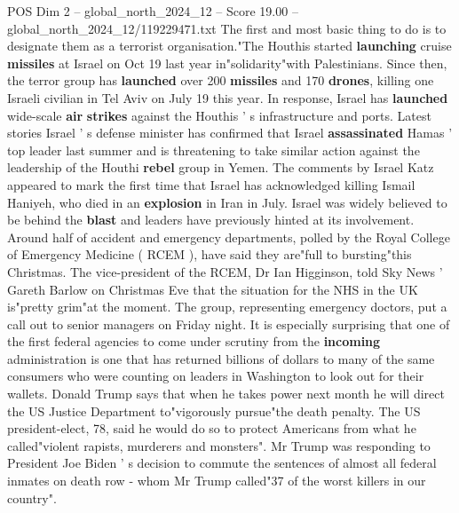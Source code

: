 \begin{textsample}{POS Dim 2 – global\_north\_2024\_12 – Score 19.00 – global\_north\_2024\_12/119229471.txt}
The first and most basic thing to do is to designate them as a terrorist organisation."The Houthis started \textbf{launching} cruise \textbf{missiles} at Israel on Oct 19 last year in"solidarity"with Palestinians.
Since then, the terror group has \textbf{launched} over 200 \textbf{missiles} and 170 \textbf{drones}, killing one Israeli civilian in Tel Aviv on July 19 this year.
In response, Israel has \textbf{launched} wide-scale \textbf{air} \textbf{strikes} against the Houthis ' s infrastructure and ports.
Latest stories Israel ' s defense minister has confirmed that Israel \textbf{assassinated} Hamas ' top leader last summer and is threatening to take similar action against the leadership of the Houthi \textbf{rebel} group in Yemen.
The comments by Israel Katz appeared to mark the first time that Israel has acknowledged killing Ismail Haniyeh, who died in an \textbf{explosion} in Iran in July.
Israel was widely believed to be behind the \textbf{blast} and leaders have previously hinted at its involvement.
Around half of accident and emergency departments, polled by the Royal College of Emergency Medicine ( RCEM ), have said they are"full to bursting"this Christmas.
The vice-president of the RCEM, Dr Ian Higginson, told Sky News ' Gareth Barlow on Christmas Eve that the situation for the NHS in the UK is"pretty grim"at the moment.
The group, representing emergency doctors, put a call out to senior managers on Friday night.
It is especially surprising that one of the first federal agencies to come under scrutiny from the \textbf{incoming} administration is one that has returned billions of dollars to many of the same consumers who were counting on leaders in Washington to look out for their wallets.
Donald Trump says that when he takes power next month he will direct the US Justice Department to"vigorously pursue"the death penalty.
The US president-elect, 78, said he would do so to protect Americans from what he called"violent rapists, murderers and monsters".
Mr Trump was responding to President Joe Biden ' s decision to commute the sentences of almost all federal inmates on death row - whom Mr Trump called"37 of the worst killers in our country".

\end{textsample}
